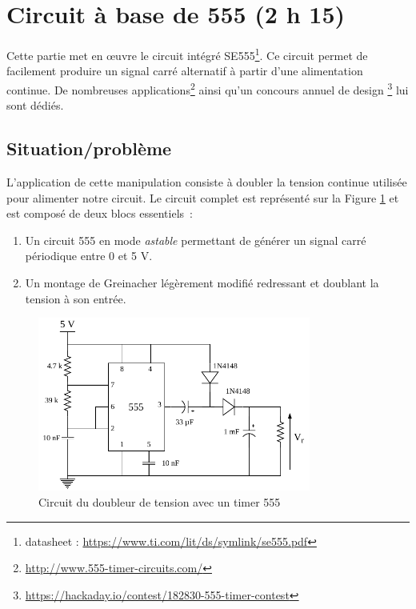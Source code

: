 \documentclass{../template/labo}
\begin{document}
{

}



\clearpage







\section{Circuit à base de 555 (2 h 15)}
Cette partie met en œuvre le circuit intégré SE555\footnote{datasheet : \url{https://www.ti.com/lit/ds/symlink/se555.pdf}}. Ce circuit permet de facilement produire un signal carré alternatif à partir d'une alimentation continue. De nombreuses applications\footnote{\url{http://www.555-timer-circuits.com/}} ainsi qu'un concours annuel de design \footnote{\url{https://hackaday.io/contest/182830-555-timer-contest}} lui sont dédiés.


\subsection{Situation/problème}

L'application de cette manipulation consiste à doubler la tension continue utilisée pour alimenter notre circuit. Le circuit complet est représenté sur la Figure \ref{Doubleur} et est composé de deux blocs essentiels~:
\begin{enumerate}
	\item Un circuit 555 en mode \textit{astable} permettant de générer un signal carré périodique entre 0 et 5 V.
	\item Un montage de Greinacher légèrement modifié redressant et doublant la tension à son entrée.
\end{enumerate}

\begin{figure}[ht]
\centering
\includegraphics[width=0.8\textwidth]{555-doubler.pdf}
\caption{Circuit du doubleur de tension avec un timer 555}
\label{Doubleur}
\end{figure}
\end{document}
